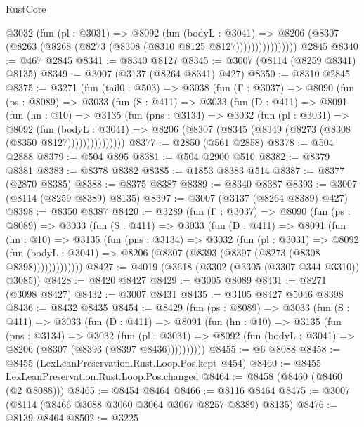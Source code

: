 \begin{lexlean}{RustCore}
\begin{coremodule}
                  @3032
                    (fun (pl : @3031) =>
                    @8092
                      (fun (bodyL : @3041) =>
                      @8206 (@8307 (@8263 (@8268 (@8273 (@8308 (@8310 @8125 @8127))))))))))))))))
    @2845
@8340 := @467 @2845
@8341 := @8340 @8127
@8345 := @3007 (@8114 (@8259 @8341) @8135)
@8349 := @3007 (@3137 (@8264 @8341) @427)
@8350 := @8310 @2845
@8375 := @3271
    (fun (tail0 : @503) =>
    @3038
      (fun (Γ : @3037) =>
      @8090
        (fun (ps : @8089) =>
        @3033
          (fun (S : @411) =>
          @3033
            (fun (D : @411) =>
            @8091
              (fun (hn : @10) =>
              @3135
                (fun (pns : @3134) =>
                @3032
                  (fun (pl : @3031) =>
                  @8092
                    (fun (bodyL : @3041) =>
                    @8206 (@8307 (@8345 (@8349 (@8273 (@8308 (@8350 @8127)))))))))))))))
@8377 := @2850 (@561 @2858)
@8378 := @504 @2888
@8379 := @504 @895
@8381 := @504 @2900 @510
@8382 := @8379 @8381
@8383 := @8378 @8382
@8385 := @1853 @8383 @514
@8387 := @8377 (@2870 @8385)
@8388 := @8375 @8387
@8389 := @8340 @8387
@8393 := @3007 (@8114 (@8259 @8389) @8135)
@8397 := @3007 (@3137 (@8264 @8389) @427)
@8398 := @8350 @8387
@8420 := @3289
    (fun (Γ : @3037) =>
    @8090
      (fun (ps : @8089) =>
      @3033
        (fun (S : @411) =>
        @3033
          (fun (D : @411) =>
          @8091
            (fun (hn : @10) =>
            @3135
              (fun (pns : @3134) =>
              @3032
                (fun (pl : @3031) =>
                @8092
                  (fun (bodyL : @3041) =>
                  @8206 (@8307 (@8393 (@8397 (@8273 (@8308 @8398)))))))))))))
@8427 := @4019 (@3618 (@3302 (@3305 (@3307 @344 @3310)) @3085))
@8428 := @8420 @8427
@8429 := @3005 @8089
@8431 := @8271 (@3098 @8427)
@8432 := @3007 @8431
@8435 := @3105 @8427 @5046 @8398
@8436 := @8432 @8435
@8454 := @8429
    (fun (ps : @8089) =>
    @3033
      (fun (S : @411) =>
      @3033
        (fun (D : @411) =>
        @8091
          (fun (hn : @10) =>
          @3135
            (fun (pns : @3134) =>
            @3032
              (fun (pl : @3031) =>
              @8092 (fun (bodyL : @3041) => @8206 (@8307 (@8393 (@8397 @8436))))))))))
@8455 := @6 @8088
@8458 := @8455 (LexLeanPreservation.Rust.Loop.Pos.kept @454)
@8460 := @8455 LexLeanPreservation.Rust.Loop.Pos.changed
@8464 := @8458 (@8460 (@8460 (@2 @8088)))
@8465 := @8454 @8464
@8466 := @8116 @8464
@8475 := @3007 (@8114 (@8466 @3088 @3060 @3064 @3067 @8257 @8389) @8135)
@8476 := @8139 @8464
@8502 := @3225

\end{coremodule}
\end{lexlean}
